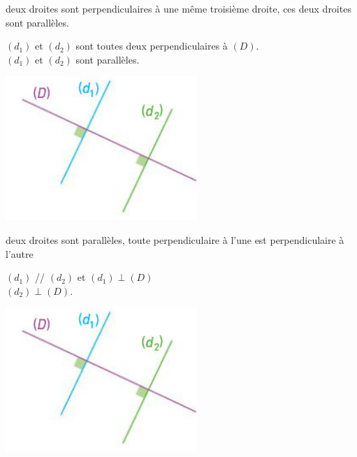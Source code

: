 \begin{myprop}
	 deux droites sont perpendiculaires à une même troisième droite,  ces deux droites sont parallèles.
\end{myprop}


\begin{myex}
	\begin{multicols}{2}
		 $(d_1)$ et $(d_2)$ sont toutes deux perpendiculaires à $(D)$.\\
		 $(d_1)$ et $(d_2)$ sont parallèles.
		
		\includegraphics[scale=0.6]{img/para2}
	\end{multicols}
	
\end{myex}


\begin{myprop}
	 deux droites sont parallèles,  toute perpendiculaire à l’une est perpendiculaire à l’autre
\end{myprop}


\begin{myex}
	\begin{multicols}{2}
		 $(d_1)$ // $(d_2)$ et $(d_1) \perp (D)$\\
		 $(d_2) \perp (D)$.
		
		\includegraphics[scale=0.6]{img/para2}
	\end{multicols}
	
\end{myex}


